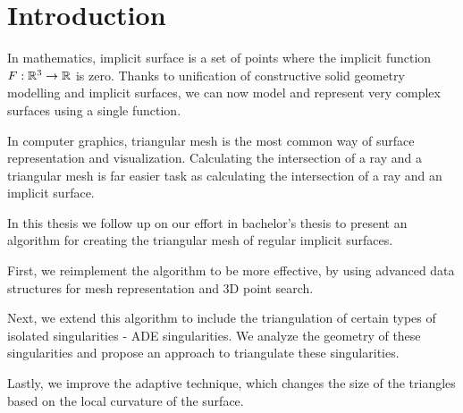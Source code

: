 \chapter*{Introduction} %

In mathematics, implicit surface is a set of points where
the implicit function $F:\mathbb{R}^3 \to \mathbb{R}$ is zero. Thanks to
unification of constructive solid geometry modelling and 
implicit surfaces, we can now model and represent very 
complex surfaces using a single function.

In computer graphics, triangular mesh is the most common
way of surface representation and visualization. Calculating
the intersection of a ray and a triangular mesh is far 
easier task as calculating the intersection of a ray and
an implicit surface.

In this thesis we follow up on our effort in bachelor's thesis
\cite{korecova2021triangulation} to present an algorithm for
creating the triangular mesh of regular implicit surfaces.

First, we reimplement the algorithm to be more effective,
by using advanced data structures for mesh representation 
and 3D point search.

Next, we extend this algorithm to include the triangulation
of certain types of isolated singularities - ADE singularities.
We analyze the geometry of these singularities and propose 
an approach to triangulate these singularities.

Lastly, we improve the adaptive technique, which changes the
size of the triangles based on the local curvature of the surface.
